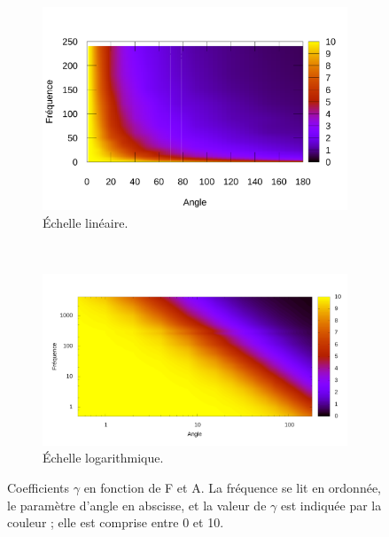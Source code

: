 	\clearpage %
	\begin{figure}[!htb]
		\centering
		\begin{subfigure}[t]{\textwidth}
			\centering
			\includegraphics[width=\textwidth]{figures/ch4/linApprox}
			\caption{Échelle linéaire.}
			\label{fig:gammaVfaLin}
		\end{subfigure}
		~
		\begin{subfigure}[t]{\textwidth}
			\centering
			\includegraphics[width=\textwidth]{figures/ch4/linApprox_log}
			\caption{Échelle logarithmique.}
			\label{fig:gammaVfaLog}
		\end{subfigure}
		\caption[Coefficients $\gamma$ en fonction de F et A]{Coefficients $\gamma$ en fonction de F et A. La fréquence se lit en ordonnée, le paramètre d'angle en abscisse, et la valeur de $\gamma$ est indiquée par la couleur ; elle est comprise entre 0 et 10.}
		\label{fig:gammaVfa}
	\end{figure}
	
